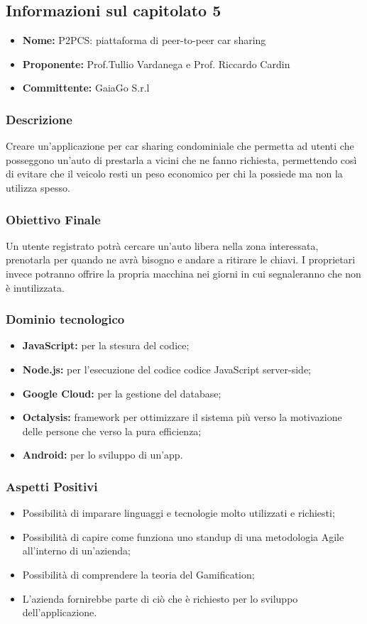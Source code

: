 \subsection{Informazioni sul capitolato 5}
\begin{itemize}
\item \textbf{Nome:} P2PCS: piattaforma di peer-to-peer car sharing
\item \textbf{Proponente:} Prof.Tullio Vardanega e Prof.
Riccardo Cardin
	\item \textbf{Committente:} GaiaGo S.r.l
\end{itemize}
\subsubsection{Descrizione}
Creare un'applicazione per car sharing condominiale che permetta ad utenti che posseggono un'auto di prestarla a vicini che ne fanno richiesta, permettendo così di evitare che il veicolo resti un peso economico per chi la possiede ma non la utilizza spesso.
\subsubsection{Obiettivo Finale}
Un utente registrato potrà cercare un'auto libera nella zona interessata, prenotarla per quando ne avrà bisogno e andare a ritirare le chiavi. I proprietari invece potranno offrire la propria macchina nei giorni in cui segnaleranno che non è inutilizzata.
\subsubsection{Dominio tecnologico}
\begin{itemize}
	\item \textbf{JavaScript:} per la stesura del codice;
	\item \textbf{Node.js:} per l'esecuzione del codice codice JavaScript server-side;
	\item \textbf{Google Cloud:} per la gestione del database;
	\item \textbf{Octalysis:} framework per ottimizzare il sistema più verso la motivazione delle persone che verso la pura efficienza;
	\item \textbf{Android:} per lo sviluppo di un'app.
\end{itemize}

\subsubsection{Aspetti Positivi}
\begin{itemize}
	\item Possibilità di imparare linguaggi e tecnologie molto utilizzati e richiesti;
	\item Possibilità di capire come funziona uno standup di una metodologia Agile all'interno di un'azienda;
	\item Possibilità di comprendere la teoria del Gamification;
	\item L'azienda fornirebbe parte di ciò che è richiesto per lo sviluppo dell'applicazione.

\end{itemize}

